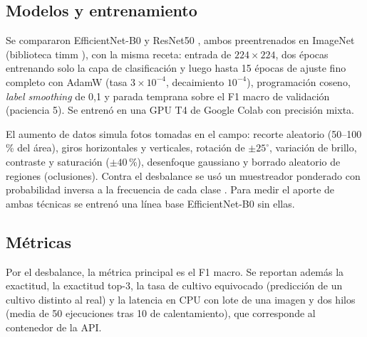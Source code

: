 \documentclass[conference]{IEEEtran}
\begin{document}
\begin{table}[t]
\caption{Conjunto de datos unificado (im\'agenes por partici\'on)}
\label{tab:dataset}
\centering\small

\end{table}

\subsection{Modelos y entrenamiento}
Se compararon EfficientNet-B0 \cite{tan2019efficientnet} y ResNet50 \cite{he2016resnet}, ambos preentrenados en ImageNet (biblioteca timm \cite{wightman2019timm}), con la misma receta: entrada de $224\times224$, dos \'epocas entrenando solo la capa de clasificaci\'on y luego hasta 15 \'epocas de ajuste fino completo con AdamW (tasa $3\times10^{-4}$, decaimiento $10^{-4}$), programaci\'on coseno, \textit{label smoothing} de 0,1 y parada temprana sobre el F1 macro de validaci\'on (paciencia 5). Se entren\'o en una GPU T4 de Google Colab con precisi\'on mixta.

El aumento de datos simula fotos tomadas en el campo: recorte aleatorio (50--100\,\% del \'area), giros horizontales y verticales, rotaci\'on de $\pm25^{\circ}$, variaci\'on de brillo, contraste y saturaci\'on ($\pm40$\,\%), desenfoque gaussiano y borrado aleatorio de regiones (oclusiones). Contra el desbalance se us\'o un muestreador ponderado con probabilidad inversa a la frecuencia de cada clase \cite{buda2018imbalance}. Para medir el aporte de ambas t\'ecnicas se entren\'o una l\'inea base EfficientNet-B0 sin ellas.

\subsection{M\'etricas}
Por el desbalance, la m\'etrica principal es el F1 macro. Se reportan adem\'as la exactitud, la exactitud top-3, la tasa de cultivo equivocado (predicci\'on de un cultivo distinto al real) y la latencia en CPU con lote de una imagen y dos hilos (media de 50 ejecuciones tras 10 de calentamiento), que corresponde al contenedor de la API.
\end{document}
